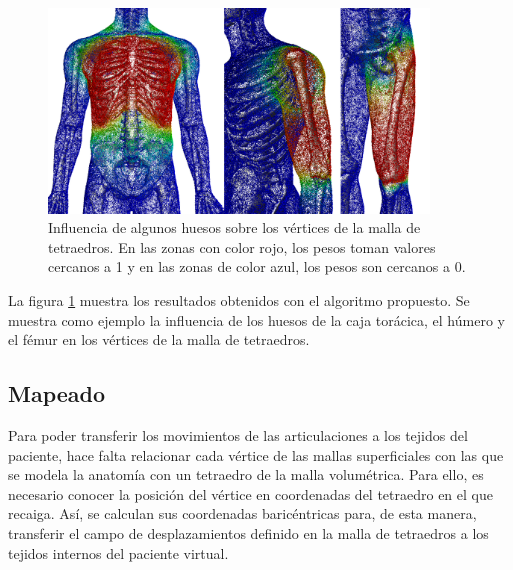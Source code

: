  \begin{figure}[ht]
   \centering
\includegraphics[width=0.9\textwidth]{IMG/weights.png}
     \caption{Influencia de algunos huesos sobre los vértices de la malla de tetraedros. En las zonas con color rojo, los pesos toman valores cercanos a 1 y en las zonas de color azul, los pesos son cercanos a 0.}
      \label{fig:pesado}
\end{figure}
 
La figura \ref{fig:pesado} muestra los resultados obtenidos con el algoritmo propuesto. Se muestra  como ejemplo la influencia de los huesos de la caja torácica, el húmero y el fémur en los vértices de la malla de tetraedros.

\subsection{Mapeado}
\label{posing:Mapeado}
%
Para poder transferir los movimientos de las articulaciones a los tejidos del paciente, hace falta relacionar cada vértice de las mallas superficiales con las que se modela la anatomía con un tetraedro de la malla volumétrica. Para ello, es necesario conocer la posición del vértice en coordenadas del tetraedro en el que recaiga. Así, se calculan sus coordenadas baricéntricas para,  de esta manera, transferir el campo de desplazamientos definido en la malla de tetraedros a los tejidos internos del paciente virtual.




%


